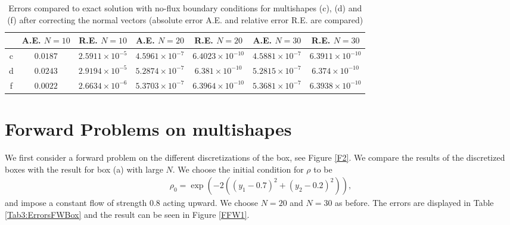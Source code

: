 \documentclass[11pt, a4paper]{article}
\theoremstyle{definition}
\begin{document}
\begin{table}
	\caption{Errors compared to exact solution with no-flux boundary conditions for multishapes (c), (d) and (f) after correcting the normal vectors (absolute error A.E. and relative error R.E. are compared)}
	\begin{tabular}{ ||c| c| c| c| c |c|c|| }
		\hline
		\hline
		& A.E. $N =10$ & R.E. $N =10$ &A.E. $N =20$ & R.E. $N =20$ &A.E. $N =30$ & R.E. $N =30$ \\ 
		\hline
		c & $0.0187$ & $2.5911 \times 10^{-5}$ & $4.5961 \times 10^{-7}$ & $6.4023 \times 10^{-10}$ & $4.5881 \times 10^{-7} $ & $6.3911 \times 10^{-10}$\\  
		d & $0.0243$ & $2.9194 \times 10^{-5} $ & $5.2874 \times 10^{-7} $ & $6.381 \times 10^{-10}$ & $5.2815 \times 10^{-7} $ & $6.374 \times 10^{-10}$\\  
		f & $0.0022$ & $2.6634 \times 10^{-6}$ & $ 5.3703 \times 10^{-7}$ & $ 6.3964\times 10^{-10}$ & $ 5.3681 \times 10^{-7}$ & $ 6.3938 \times 10^{-10}$\\
		\hline
		\hline
	\end{tabular}
	\label{Tab3:ErrorsNoFlux2}
\end{table}


\section{Forward Problems on multishapes}
We first consider a forward problem on the different discretizations of the box, see Figure \ref{F2}. We compare the results of the discretized boxes with the result for box (a) with large $N$.
We choose the initial condition for $\rho$ to be
\begin{align*}
	\rho_0 = \exp(-2((y_1 - 0.7 )^2 + (y_2 - 0.2)^2)),
\end{align*}
and impose a constant flow of strength $0.8$ acting upward.
We choose $N = 20$ and $N = 30$ as before. The errors are displayed in Table \ref{Tab3:ErrorsFWBox} and the result can be seen in Figure \ref{FFW1}. 
\end{document}

